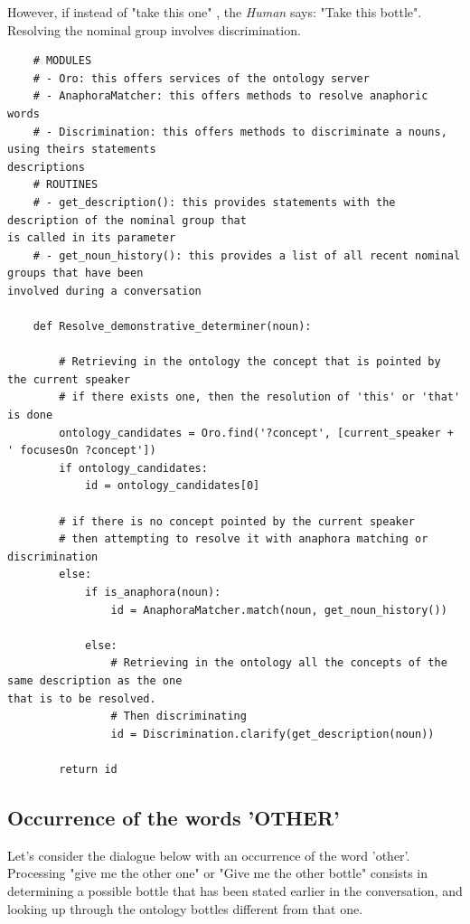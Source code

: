 \documentclass[twoside,a4paper,10pt]{report}
\begin{document}
However, if instead of "take this one" , the \textsl{Human} says: "Take this bottle". Resolving the nominal group involves discrimination. 


\lstset{language=python}
\begin{lstlisting}
    # MODULES
    # - Oro: this offers services of the ontology server
    # - AnaphoraMatcher: this offers methods to resolve anaphoric words
    # - Discrimination: this offers methods to discriminate a nouns, using theirs statements
descriptions
    # ROUTINES
    # - get_description(): this provides statements with the description of the nominal group that
is called in its parameter
    # - get_noun_history(): this provides a list of all recent nominal groups that have been
involved during a conversation 
    
    def Resolve_demonstrative_determiner(noun):
        
        # Retrieving in the ontology the concept that is pointed by the current speaker
        # if there exists one, then the resolution of 'this' or 'that' is done
        ontology_candidates = Oro.find('?concept', [current_speaker + ' focusesOn ?concept'])
        if ontology_candidates:
            id = ontology_candidates[0]
        
        # if there is no concept pointed by the current speaker
        # then attempting to resolve it with anaphora matching or discrimination
        else:
            if is_anaphora(noun):
                id = AnaphoraMatcher.match(noun, get_noun_history())
                
            else:
                # Retrieving in the ontology all the concepts of the same description as the one
that is to be resolved.
                # Then discriminating
                id = Discrimination.clarify(get_description(noun))
                    
        return id

\end{lstlisting}

\subsection{Occurrence of the words 'OTHER'}
\label{b7ebf691f8433bd42593d3ebb2d2c14a}%

Let's consider the dialogue below with an occurrence of the word 'other'. Processing "give me the other one" or "Give me the other bottle" consists in determining a possible bottle that has been stated earlier in the conversation, and looking up through the ontology bottles different from that one.
\end{document}
